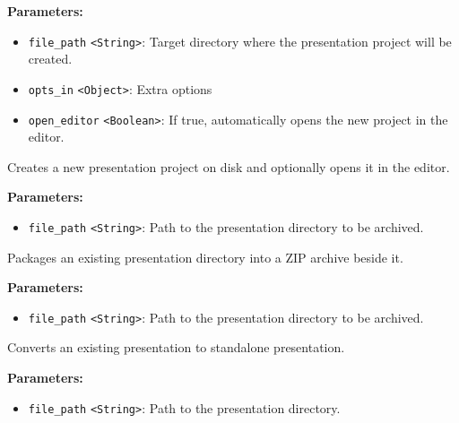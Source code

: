 \documentclass[12pt,a4paper]{article}
\begin{document}
\noindent \textbf{Parameters:}
\begin{itemize}
  \item \texttt{file\_path} \texttt{<String>}: Target directory where the presentation project will be created.
  \item \texttt{opts\_in} \texttt{<Object>}: Extra options
  \item \texttt{open\_editor} \texttt{<Boolean>}: If true, automatically opens the new project in the editor.
\end{itemize}

\noindent Creates a new presentation project on disk and optionally opens it in the editor.

\vspace{5mm}
\noindent {}


\noindent \textbf{Parameters:}
\begin{itemize}
  \item \texttt{file\_path} \texttt{<String>}: Path to the presentation directory to be archived.
\end{itemize}

\noindent Packages an existing presentation directory into a ZIP archive beside it.

\vspace{5mm}
\noindent {}


\noindent \textbf{Parameters:}
\begin{itemize}
  \item \texttt{file\_path} \texttt{<String>}: Path to the presentation directory to be archived.
\end{itemize}

\noindent Converts an existing presentation to standalone presentation.

\vspace{5mm}
\noindent {}


\noindent \textbf{Parameters:}
\begin{itemize}
  \item \texttt{file\_path} \texttt{<String>}: Path to the presentation directory.
\end{itemize}
\end{document}
